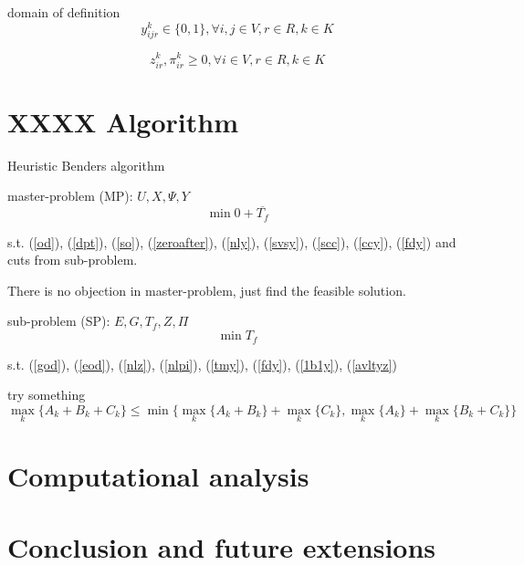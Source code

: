 \documentclass[preprint,12pt,authoryear]{elsarticle}
\begin{document}
domain of definition
\begin{equation}
    y_{ijr}^k\in \{0,1\}, \forall i,j\in V,r\in R,k\in K
\label{ddy}
\end{equation}

\begin{equation}
    z_{ir}^k,\pi_{ir}^k\geq 0, \forall i\in V,r\in R,k\in K
\label{ddz}
\end{equation}


\section{XXXX Algorithm}

Heuristic Benders algorithm

master-problem (MP):
$U,X,\Psi,Y$
\begin{equation}
    \min 0+\overline{T_f}
\label{mobj}
\end{equation}

s.t. (\ref{od}), (\ref{dpt}), (\ref{so}), (\ref{zeroafter}), (\ref{nly}), 
(\ref{svsy}), (\ref{scc}), (\ref{ccy}), (\ref{fdy}) and cuts from sub-problem.

There is no objection in master-problem, just find the feasible solution.

sub-problem (SP):
$E,G,T_f,Z,\Pi$
\begin{equation}
    \min T_f
\label{sobj}
\end{equation}

s.t. (\ref{god}), (\ref{eod}), (\ref{nlz}), (\ref{nlpi}), (\ref{tmy}), (\ref{fdy}), (\ref{1b1y}), (\ref{avltyz})


try something
\begin{equation}
    \max_k \{A_k+B_k+C_k\} \leq 
    \min \{ 
        \max_k \{A_k+B_k\}+\max_k \{C_k\},
        \max_k \{A_k\}+\max_k \{B_k+C_k\}
    \}
\label{sobj}
\end{equation}

\section{Computational analysis}

\section{Conclusion and future extensions}

\end{document}
